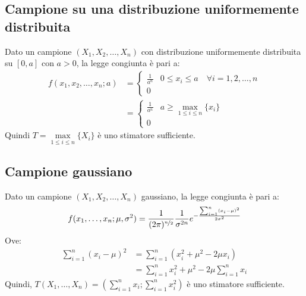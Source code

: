 \documentclass[12pt]{report}
\begin{document}
 		\subsection{Campione su una distribuzione uniformemente distribuita}
 		Dato un campione $(X_1, X_2, \dots, X_n)$ con distribuzione uniformemente distribuita su $[0, a]$ con $a > 0$, la legge congiunta è pari a:
 		\begin{align*}
 		f(x_1, x_2, \dots, x_n; a) &= \begin{cases}
 			\frac{1}{a^n} & 0 \leq x_i \leq a \quad \forall i = 1, 2, \dots, n  \\
 			0
 		\end{cases} \\
 		&= \begin{cases}
 		\frac{1}{a^n} & a \geq \underset{1 \leq i \leq n}{\max}\{x_i\} \\
 		0
 		\end{cases}
 		\end{align*}
 		Quindi $T = \underset{1 \leq i \leq n}{\max}\{X_i\}$ è uno stimatore sufficiente.
 		\subsection{Campione gaussiano}
 		Dato un campione $(X_1, X_2, \dots, X_n)$ gaussiano, la legge congiunta è pari a:
 		\[
 		f(x_1, \dots, x_n; \mu, \sigma^2) = \frac{1}{(2\pi)^{\nicefrac{n}{2}}}\frac{1}{\sigma^{2n}}e^{-\frac{\sum_{i=1}^{n}(x_i - \mu)^2}{2\sigma^2}}
 		\]
 		Ove:
 		\begin{align*}
 			\sum_{i=1}^{n}(x_i - \mu)^2 &= \sum_{i=1}^{n}(x_i^2 + \mu^2 - 2\mu x_i) \\
 			&= \sum_{i=1}^{n}x_i^2 + \mu^2 - 2\mu\sum_{i=1}^{n}x_i
 		\end{align*}
 		Quindi, $T(X_1, \dots, X_n) = (\sum_{i=1}^{n}x_i; \sum_{i=1}^{n}x_i^2)$ è uno stimatore sufficiente.
\end{document}
